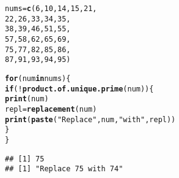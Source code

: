\documentclass{article}\usepackage[]{graphicx}\usepackage[]{xcolor}
\makeatletter
\newcommand{\hlnum}[1]{\textcolor[rgb]{0.686,0.059,0.569}{#1}}%
\newcommand{\hlsng}[1]{\textcolor[rgb]{0.192,0.494,0.8}{#1}}%
\newcommand{\hlopt}[1]{\textcolor[rgb]{0,0,0}{#1}}%
\newcommand{\hldef}[1]{\textcolor[rgb]{0.345,0.345,0.345}{#1}}%
\newcommand{\hlkwa}[1]{\textcolor[rgb]{0.161,0.373,0.58}{\textbf{#1}}}%
\newcommand{\hlkwb}[1]{\textcolor[rgb]{0.69,0.353,0.396}{#1}}%
\newcommand{\hlkwd}[1]{\textcolor[rgb]{0.737,0.353,0.396}{\textbf{#1}}}%
\newenvironment{kframe}{%
 \def\at@end@of@kframe{}%
 \ifinner\ifhmode%
  \def\at@end@of@kframe{\end{minipage}}%
  \begin{minipage}{\columnwidth}%
 \fi\fi%
 \def\FrameCommand##1{\hskip\@totalleftmargin \hskip-\fboxsep
 \colorbox{shadecolor}{##1}\hskip-\fboxsep
     \hskip-\linewidth \hskip-\@totalleftmargin \hskip\columnwidth}%
 \MakeFramed {\advance\hsize-\width
   \@totalleftmargin\z@ \linewidth\hsize
   \@setminipage}}%
 {\par\unskip\endMakeFramed%
 \at@end@of@kframe}
\newenvironment{knitrout}{}{} %
\makeatother
\begin{document}
\begin{enumerate}
\begin{knitrout}
\begin{kframe}
\begin{alltt}
\hldef{nums} \hlkwb{=} \hlkwd{c}\hldef{(}\hlnum{6}\hldef{,} \hlnum{10}\hldef{,} \hlnum{14}\hldef{,} \hlnum{15}\hldef{,} \hlnum{21}\hldef{,}
         \hlnum{22}\hldef{,} \hlnum{26}\hldef{,} \hlnum{33}\hldef{,} \hlnum{34}\hldef{,} \hlnum{35}\hldef{,}
         \hlnum{38}\hldef{,} \hlnum{39}\hldef{,} \hlnum{46}\hldef{,} \hlnum{51}\hldef{,} \hlnum{55}\hldef{,}
         \hlnum{57}\hldef{,} \hlnum{58}\hldef{,} \hlnum{62}\hldef{,} \hlnum{65}\hldef{,} \hlnum{69}\hldef{,}
         \hlnum{75}\hldef{,} \hlnum{77}\hldef{,} \hlnum{82}\hldef{,} \hlnum{85}\hldef{,} \hlnum{86}\hldef{,}
         \hlnum{87}\hldef{,} \hlnum{91}\hldef{,} \hlnum{93}\hldef{,} \hlnum{94}\hldef{,} \hlnum{95}\hldef{)}

\hlkwa{for} \hldef{(num} \hlkwa{in} \hldef{nums) \{}
  \hlkwa{if} \hldef{(}\hlopt{!}\hlkwd{product.of.unique.prime}\hldef{(num))\{}
    \hlkwd{print}\hldef{(num)}
    \hldef{repl} \hlkwb{=} \hlkwd{replacement}\hldef{(num)}
    \hlkwd{print}\hldef{(}\hlkwd{paste}\hldef{(}\hlsng{"Replace"}\hldef{, num,} \hlsng{"with"}\hldef{, repl))}
  \hldef{\}}
\hldef{\}}
\end{alltt}
\begin{verbatim}
## [1] 75
## [1] "Replace 75 with 74"
\end{verbatim}
\end{kframe}
\end{knitrout}
\end{enumerate}


\end{document}
